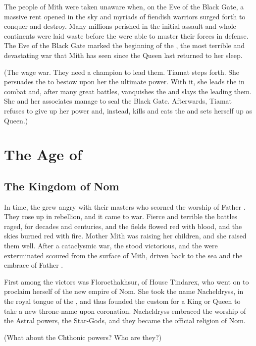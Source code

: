 The people of Mith were taken unaware when, on the Eve of the Black Gate, a massive rent opened in the sky and myriads of fiendish \bane{} warriors surged forth to conquer and destroy. Many millions perished in the initial assault and whole continents were laid waste before the \dragons{} were able to muster their forces in defense. The Eve of the Black Gate marked the beginning of the \Banewar, the most terrible and devastating war that Mith has seen since the \Kraken{} Queen last returned to her sleep. 

(The \dragons{} wage war. They need a champion to lead them. Tiamat steps forth. She persuades the \dragonlords{} to bestow upon her the ultimate power. With it, she leads the \dragons{} in combat and, after many great battles, vanquishes the \banes{} and slays the \banelord{} leading them. She and her associates manage to seal the Black Gate. Afterwards, Tiamat refuses to give up her power and, instead, kills and eats the \dragonlords{} and sets herself up as Queen.) 

\section{The Age of \Dragons{}}
\subsection{The Kingdom of Nom}
\label{Kingdom of Nom}
In time, the \nagae{} grew angry with their \draconic{} masters who scorned the worship of Father \Moroch{}. They rose up in rebellion, and it came to war. Fierce and terrible the battles raged, for decades and centuries, and the fields flowed red with blood, and the skies burned red with fire. Mother Mith was raising her children, and she raised them well. After a cataclysmic war, the \dragons{} stood victorious, and the \nagae{} were exterminated scoured from the surface of Mith, driven back to the sea and the embrace of Father \Moroch{}. 

First among the victors was Florocthakhsur, \dragonlord{} of House Tindarex, who went on to proclaim herself \DragonQueen{} of the new empire of Nom. She took the name Nacheldryss,  in the royal tongue of the \dragons{}, and thus founded the custom for a King or Queen to take a new throne-name upon coronation. Nacheldryss embraced the worship of the Astral powers, the Star-Gods, and they became the official religion of Nom. 

(What about the Chthonic powers? Who are they?) 

